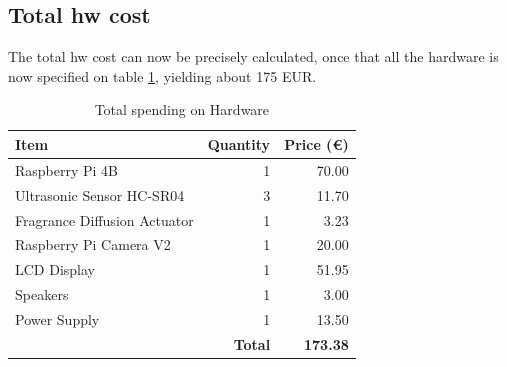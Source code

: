 \subsection{Total \gls{hw} cost}

The total \gls{hw} cost can now be precisely calculated, once that all the
hardware is now specified on table \ref{tab:hw-costs}, yielding about 175 EUR.

\begingroup
\renewcommand{\arraystretch}{0.7} %
\begin{table}[!hbt]
\centering
\caption{Total spending on Hardware}
\label{tab:hw-costs}
\begin{tabular}{@{}lrr@{}}
\toprule
\textbf{Item}                & \multicolumn{1}{l}{\textbf{Quantity}} & \multicolumn{1}{l}{\textbf{Price (€)}} \\ \midrule
Raspberry Pi 4B              & 1                                     & 70.00                                  \\ \midrule
Ultrasonic Sensor HC-SR04    & 3                                     & 11.70                                  \\ \midrule
Fragrance Diffusion Actuator & 1                                     & 3.23                                   \\ \midrule
Raspberry Pi Camera V2       & 1                                     & 20.00                                  \\ \midrule
LCD Display                  & 1                                     & 51.95                                  \\ \midrule
Speakers                     & 1                                     & 3.00                                   \\ \midrule
Power Supply                 & 1                                     & 13.50                                  \\ \midrule
\multicolumn{2}{r}{\textbf{Total}}                                   & \textbf{173.38}                        \\ \bottomrule
\end{tabular}
\end{table}

